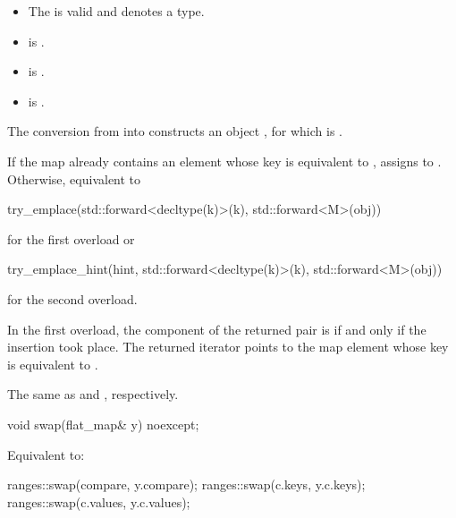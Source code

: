 \begin{itemdescr}
\pnum
\constraints
\begin{itemize}
\item
The  
is valid and denotes a type.
\item
{} is .
\item
{} is .
\item
{} is .
\end{itemize}

\pnum
\expects
The conversion from  into  constructs
an object , for which  is .

\pnum
\effects
If the map already contains an element 
whose key is equivalent to ,
assigns  to .
Otherwise, equivalent to
\begin{codeblock}
try_emplace(std::forward<decltype(k)>(k), std::forward<M>(obj))
\end{codeblock}
for the first overload or
\begin{codeblock}
try_emplace_hint(hint, std::forward<decltype(k)>(k), std::forward<M>(obj))
\end{codeblock}
for the second overload.

\pnum
\returns
In the first overload,
the  component of the returned pair is 
if and only if the insertion took place.
The returned iterator points to the map element
whose key is equivalent to .

\pnum
\complexity
The same as  and , respectively.
\end{itemdescr}

%
\begin{itemdecl}
void swap(flat_map& y) noexcept;
\end{itemdecl}

\begin{itemdescr}
\pnum
\effects
Equivalent to:
\begin{codeblock}
ranges::swap(compare, y.compare);
ranges::swap(c.keys, y.c.keys);
ranges::swap(c.values, y.c.values);
\end{codeblock}
\end{itemdescr}

